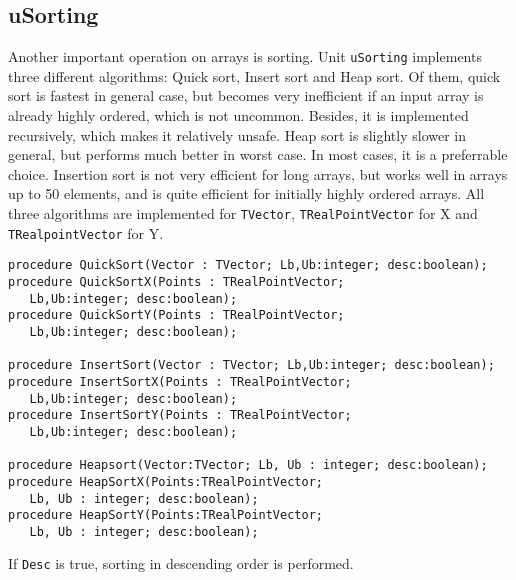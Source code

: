 \documentclass[12pt,a4paper,oneside]{article}
\newcommand{\code}[1]{\texttt{#1}}
\begin{document}
\subsection{uSorting}
Another important operation on arrays is sorting. Unit \code{uSorting} implements three different algorithms: Quick sort, Insert sort and Heap sort. Of them, quick sort is fastest in general case, but becomes very inefficient if an input array is already highly ordered, which is not uncommon. Besides, it is implemented recursively, which makes it relatively unsafe. Heap sort is slightly slower in general, but performs much better in worst case. In most cases, it is a preferrable choice. Insertion sort is not very efficient for long arrays, but works well in arrays up to 50 elements, and is quite efficient for initially highly ordered arrays. All three algorithms are implemented for \code{TVector}, \code{TRealPointVector} for X and \code{TRealpointVector} for Y.
\begin{verbatim}
procedure QuickSort(Vector : TVector; Lb,Ub:integer; desc:boolean);
procedure QuickSortX(Points : TRealPointVector; 
   Lb,Ub:integer; desc:boolean);
procedure QuickSortY(Points : TRealPointVector; 
   Lb,Ub:integer; desc:boolean);

procedure InsertSort(Vector : TVector; Lb,Ub:integer; desc:boolean);
procedure InsertSortX(Points : TRealPointVector; 
   Lb,Ub:integer; desc:boolean);
procedure InsertSortY(Points : TRealPointVector; 
   Lb,Ub:integer; desc:boolean);

procedure Heapsort(Vector:TVector; Lb, Ub : integer; desc:boolean);
procedure HeapSortX(Points:TRealPointVector; 
   Lb, Ub : integer; desc:boolean);
procedure HeapSortY(Points:TRealPointVector; 
   Lb, Ub : integer; desc:boolean);
\end{verbatim}
If \code{Desc} is true, sorting in descending order is performed.
\end{document}
